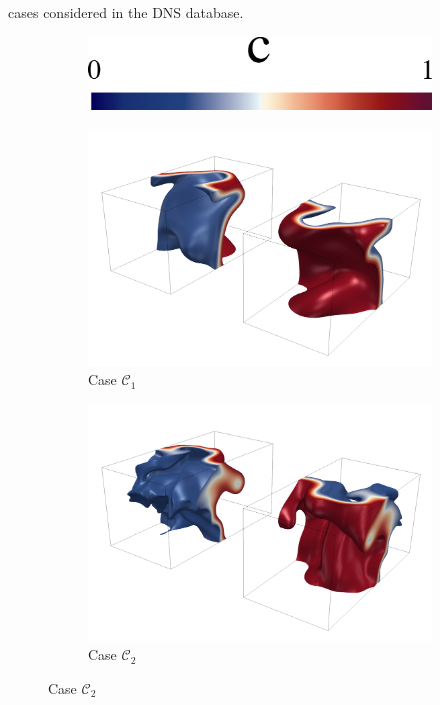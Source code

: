 \documentclass[review,times,sort&compress]{elsarticle}
\begin{document}
cases considered in the DNS database.
%
\begin{figure}[htpb]
\centering
\begin{subfigure}{.5\textwidth}
\centering
\includegraphics[width=.5\textwidth]{./figs/progvar/cmap.pdf}
\end{subfigure}

\vspace{2em}

\begin{subfigure}{.48\textwidth}
\centering
\includegraphics[width=.99\textwidth]{./figs/progvar/case1.pdf}
\caption{Case $\mathcal{C}_1$}
\label{fig:progvar_contour_case1}
\end{subfigure}
%
\begin{subfigure}{.48\textwidth}
\centering
\includegraphics[width=.99\textwidth]{./figs/progvar/case2.pdf}
\caption{Case $\mathcal{C}_2$}
\label{fig:progvar_contour_case2}
\end{subfigure}


\end{figure}
\end{document}
